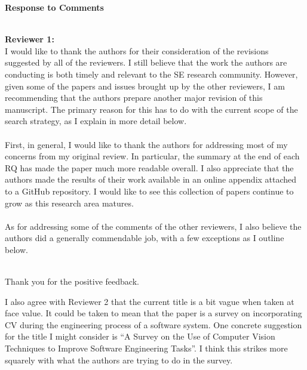 \documentclass[12pt]{article}
\newcommand\response[1]{\textcolor{responseColor}{\\#1\\}}
\begin{document}



\newpage

{\large \bf Response to Comments\\ \\}


\textbf{Reviewer 1:} \\

I would like to thank the authors for their consideration 
of the revisions suggested by all of the reviewers. I 
still believe that the work the authors are conducting 
is both timely and relevant to the SE research community. 
However, given some of the papers and issues brought up 
by the other reviewers, I am recommending that the authors 
prepare another major revision of this manuscript. The 
primary reason for this has to do with the current 
scope of the search strategy, as I explain in more detail below.
\\ \\
First, in general, I would like to thank the authors 
for addressing most of my concerns from my original 
review. In particular, the summary at the end of each 
RQ has made the paper much more readable overall. I 
also appreciate that the authors made the results of 
their work available in an online appendix attached 
to a GitHub repository. I would like to see this 
collection of papers continue to grow as this research 
area matures.
\\ \\
As for addressing some of the comments of the other 
reviewers, I also believe the authors did a generally 
commendable job, with a few exceptions as I outline below. 

\response{Thank you for the positive feedback.}

I also agree with Reviewer 2 
that the current title is a bit vague 
when taken at face value. 
It could be taken to mean that 
the paper is a survey on incorporating CV 
during the engineering process of a software system. 
One concrete suggestion for the title I might consider
 is ``A Survey on the Use of Computer Vision Techniques
  to Improve Software Engineering Tasks''. 
  I think this strikes more squarely 
  with what the authors are trying to do in the survey.
\end{document}
